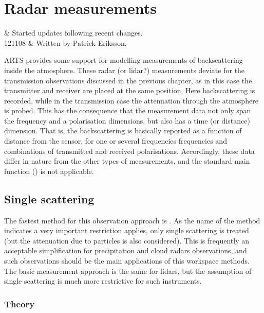 \chapter{Radar measurements}
 \label{sec:cradar}


 & Started updates following recent changes.\\
 121108 & Written by Patrick Eriksson.\\
\stophistory

ARTS provides some support for modelling measurements of backscattering inside
the atmosphere. These radar (or lidar?) measurements deviate for the
transmission observations discussed in the previous chapter, as in this case
the transmitter and receiver are placed at the same position. Here
backscattering is recorded, while in the transmission case the attenuation
through the atmosphere is probed. This has the consequence that the measurement
data not only span the frequency and a polarisation dimensions, but also has a
time (or distance) dimension. That is, the backscattering is basically reported
as a function of distance from the sensor, for one or several frequencies
frequencies and combinations of transmitted and received polarisations.
Accordingly, these data differ in nature from the other types of measurements,
and the standard main function () is not applicable.



\section{Single scattering}
\label{sec:cradar:single}

The fastest method for this observation approach is
. As the name of the method indicates a very
important restriction applies, only single scattering is treated (but the
attenuation due to particles is also considered). This is frequently an
acceptable simplification for precipitation and cloud radars observations, and
such observations should be the main applications of this workspace methods.
The basic measurement approach is the same for lidars, but the assumption of
single scattering is much more restrictive for such instruments.

\subsection{Theory}
\label{sec:cradar:theory}


